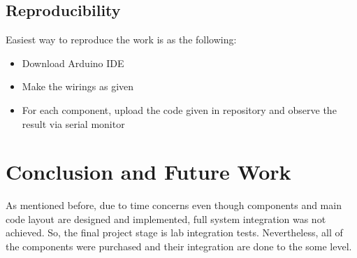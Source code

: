 \documentclass[conference]{IEEEtran}
\begin{document}
\subsection{Reproducibility}
Easiest way to reproduce the work is as the following:
\begin{itemize}
    \item Download Arduino IDE
    \item Make the wirings as given
    \item For each component, upload the code given in repository and observe the result via serial monitor
\end{itemize}
\section{Conclusion and Future Work}
As mentioned before, due to time concerns even though components and main code layout are designed and implemented, full system integration was not achieved. So, the final project stage is lab integration tests. Nevertheless, all of the components were purchased and their integration are done to the some level.



\end{document}
